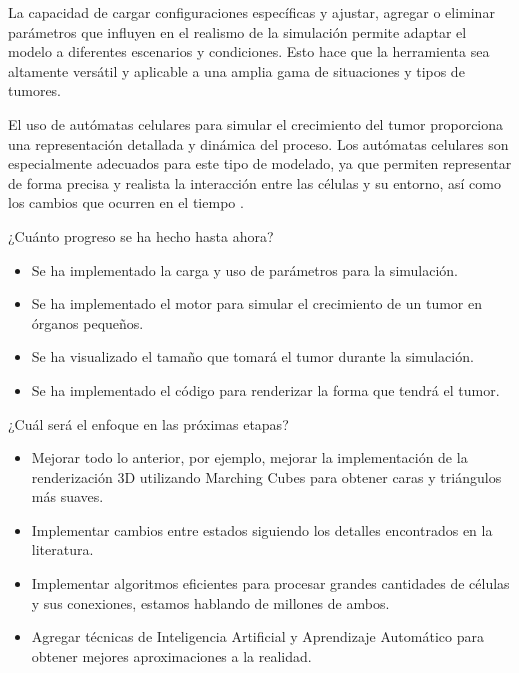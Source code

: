 \begin{conclusions}
La capacidad de cargar configuraciones específicas y ajustar, agregar o eliminar parámetros que influyen en el realismo de la simulación permite adaptar el modelo a diferentes escenarios y condiciones. Esto hace que la herramienta sea altamente versátil y aplicable a una amplia gama de situaciones y tipos de tumores.

El uso de autómatas celulares para simular el crecimiento del tumor proporciona una representación detallada y dinámica del proceso. Los autómatas celulares son especialmente adecuados para este tipo de modelado, ya que permiten representar de forma precisa y realista la interacción entre las células y su entorno, así como los cambios que ocurren en el tiempo \cite{book}.

¿Cuánto progreso se ha hecho hasta ahora?
\begin{itemize}
    \item Se ha implementado la carga y uso de parámetros para la simulación.
    \item Se ha implementado el motor para simular el crecimiento de un tumor en órganos pequeños. 
    \item Se ha visualizado el tamaño que tomará el tumor durante la simulación.
    \item Se ha implementado el código para renderizar la forma que tendrá el tumor.
\end{itemize}

¿Cuál será el enfoque en las próximas etapas? 
\begin{itemize}
    \item Mejorar todo lo anterior, por ejemplo, mejorar la implementación de la renderización 3D utilizando Marching Cubes para obtener caras y triángulos más suaves.
    \item  Implementar cambios entre estados siguiendo los detalles encontrados en la literatura.
    \item Implementar algoritmos eficientes para procesar grandes cantidades de células y sus conexiones, estamos hablando de millones de ambos.
    \item Agregar técnicas de Inteligencia Artificial y Aprendizaje Automático para obtener mejores aproximaciones a la realidad.
\end{itemize}

\end{conclusions}
